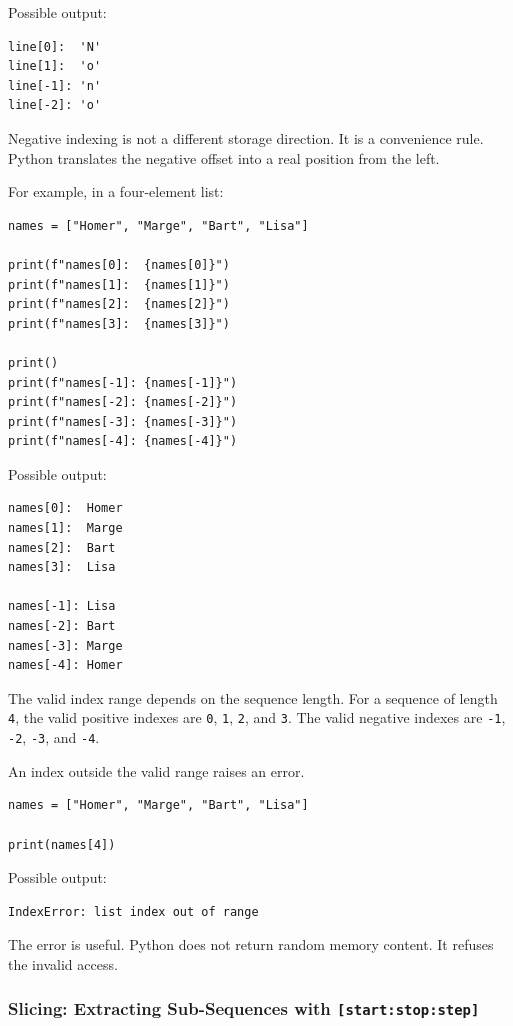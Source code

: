 Possible output:

\begin{verbatim}
line[0]:  'N'
line[1]:  'o'
line[-1]: 'n'
line[-2]: 'o'
\end{verbatim}

Negative indexing is not a different storage direction. It is a convenience rule. Python translates the negative offset into a real position from the left.

For example, in a four-element list:

\begin{verbatim}
names = ["Homer", "Marge", "Bart", "Lisa"]

print(f"names[0]:  {names[0]}")
print(f"names[1]:  {names[1]}")
print(f"names[2]:  {names[2]}")
print(f"names[3]:  {names[3]}")

print()
print(f"names[-1]: {names[-1]}")
print(f"names[-2]: {names[-2]}")
print(f"names[-3]: {names[-3]}")
print(f"names[-4]: {names[-4]}")
\end{verbatim}

Possible output:

\begin{verbatim}
names[0]:  Homer
names[1]:  Marge
names[2]:  Bart
names[3]:  Lisa

names[-1]: Lisa
names[-2]: Bart
names[-3]: Marge
names[-4]: Homer
\end{verbatim}

The valid index range depends on the sequence length. For a sequence of length \texttt{4}, the valid positive indexes are \texttt{0}, \texttt{1}, \texttt{2}, and \texttt{3}. The valid negative indexes are \texttt{-1}, \texttt{-2}, \texttt{-3}, and \texttt{-4}.

An index outside the valid range raises an error.

\begin{verbatim}
names = ["Homer", "Marge", "Bart", "Lisa"]

print(names[4])
\end{verbatim}

Possible output:

\begin{verbatim}
IndexError: list index out of range
\end{verbatim}

The error is useful. Python does not return random memory content. It refuses the invalid access.

\subsubsection{Slicing: Extracting Sub-Sequences with \texttt{[start:stop:step]}}

